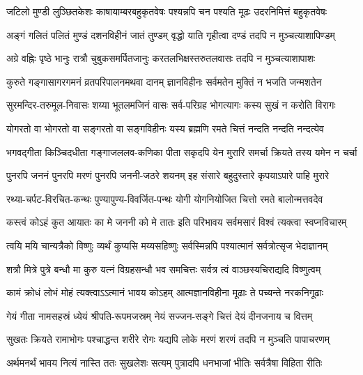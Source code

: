 \begin{large}
\begin{multicols}{2}
\begin{flushleft}
\fourlineindentedshloka
{जटिलो मुण्डी लुञ्छितकेशः}
{काषायाम्बरबहुकृतवेषः}
{पश्यन्नपि चन पश्यति मूढः}
{उदरनिमित्तं बहुकृतवेषः}

\fourlineindentedshloka
{अङ्गं गलितं पलितं मुण्डं}
{दशनविहीनं जातं तुण्डम्}
{वृद्धो याति गृहीत्वा दण्डं}
{तदपि न मुञ्चत्याशापिण्डम्}

\fourlineindentedshloka
{अग्रे वह्निः पृष्ठे भानुः}
{रात्रौ चुबुकसमर्पितजानुः}
{करतलभिक्षस्तरुतलवासः}
{तदपि न मुञ्चत्याशापाशः}

\fourlineindentedshloka
{कुरुते गङ्गासागरगमनं}
{व्रतपरिपालनमथवा दानम्}
{ज्ञानविहीनः सर्वमतेन}
{मुक्तिं न भजति जन्मशतेन}

\fourlineindentedshloka
{सुरमन्दिर-तरुमूल-निवासः}
{शय्या भूतलमजिनं वासः}
{सर्व-परिग्रह भोगत्यागः}
{कस्य सुखं न करोति विरागः}

\fourlineindentedshloka
{योगरतो वा भोगरतो वा}
{सङ्गरतो वा सङ्गविहीनः}
{यस्य ब्रह्मणि रमते चित्तं}
{नन्दति नन्दति नन्दत्येव}

\fourlineindentedshloka
{भगवद्गीता किञ्चिदधीता}
{गङ्गाजललव-कणिका पीता}
{सकृदपि येन मुरारि समर्चा}
{क्रियते तस्य यमेन न चर्चा}

\fourlineindentedshloka
{पुनरपि जननं पुनरपि मरणं}
{पुनरपि जननी-जठरे शयनम्}
{इह संसारे बहुदुस्तारे}
{कृपयाऽपारे पाहि मुरारे}

\fourlineindentedshloka
{रथ्या-चर्पट-विरचित-कन्थः}
{पुण्यापुण्य-विवर्जित-पन्थः}
{योगी योगनियोजित चित्तो}
{रमते बालोन्मत्तवदेव}

\fourlineindentedshloka
{कस्त्वं कोऽहं कुत आयातः}
{का मे जननी को मे तातः}
{इति परिभावय सर्वमसारं}
{विश्वं त्यक्त्वा स्वप्नविचारम्}

\fourlineindentedshloka
{त्वयि मयि चान्यत्रैको विष्णुः}
{व्यर्थं कुप्यसि मय्यसहिष्णुः}
{सर्वस्मिन्नपि पश्यात्मानं}
{सर्वत्रोत्सृज भेदाज्ञानम्}

\fourlineindentedshloka
{शत्रौ मित्रे पुत्रे बन्धौ}
{मा कुरु यत्नं विग्रहसन्धौ}
{भव समचित्तः सर्वत्र त्वं}
{वाञ्छस्यचिराद्यदि विष्णुत्वम्}

\fourlineindentedshloka
{कामं क्रोधं लोभं मोहं}
{त्यक्त्वाऽऽत्मानं भावय कोऽहम्}
{आत्मज्ञानविहीना मूढाः}
{ते पच्यन्ते नरकनिगूढाः}

\fourlineindentedshloka
{गेयं गीता नामसहस्रं}
{ध्येयं श्रीपति-रूपमजस्रम्}
{नेयं सज्जन-सङ्गे चित्तं}
{देयं दीनजनाय च वित्तम्}

\fourlineindentedshloka
{सुखतः क्रियते रामाभोगः}
{पश्चाद्धन्त शरीरे रोगः}
{यद्यपि लोके मरणं शरणं}
{तदपि न मुञ्चति पापाचरणम्}

\fourlineindentedshloka
{अर्थमनर्थं भावय नित्यं}
{नास्ति ततः सुखलेशः सत्यम्}
{पुत्रादपि धनभाजां भीतिः}
{सर्वत्रैषा विहिता रीतिः}


\end{flushleft}
\end{multicols}
\end{large}
